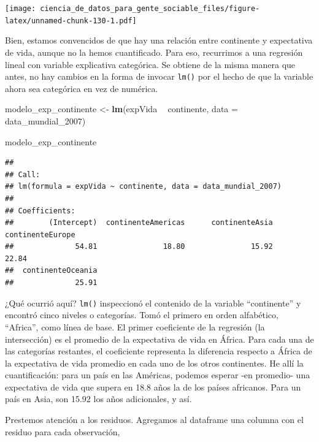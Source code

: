 \documentclass[spanish,]{book}
\newenvironment{Shaded}{\begin{snugshade}}{\end{snugshade}}
\newcommand{\DataTypeTok}[1]{\textcolor[rgb]{0.13,0.29,0.53}{#1}}
\newcommand{\DecValTok}[1]{\textcolor[rgb]{0.00,0.00,0.81}{#1}}
\newcommand{\KeywordTok}[1]{\textcolor[rgb]{0.13,0.29,0.53}{\textbf{#1}}}
\newcommand{\NormalTok}[1]{#1}
\newcommand{\OperatorTok}[1]{\textcolor[rgb]{0.81,0.36,0.00}{\textbf{#1}}}
\newcommand{\StringTok}[1]{\textcolor[rgb]{0.31,0.60,0.02}{#1}}
\begin{document}
\texttt{[image: ciencia\_de\_datos\_para\_gente\_sociable\_files/figure-latex/unnamed-chunk-130-1.pdf]}

Bien, estamos convencidos de que hay una relación entre continente y expectativa de vida, aunque no la hemos cuantificado. Para eso, recurrimos a una regresión lineal con variable explicativa categórica. Se obtiene de la misma manera que antes, no hay cambios en la forma de invocar \texttt{lm()} por el hecho de que la variable ahora sea categórica en vez de numérica.

\begin{Shaded}
\begin{Highlighting}[]
\NormalTok{modelo_exp_continente <-}\StringTok{ }\KeywordTok{lm}\NormalTok{(expVida }\OperatorTok{~}\StringTok{ }\NormalTok{continente, }\DataTypeTok{data =}\NormalTok{ data_mundial_}\DecValTok{2007}\NormalTok{)}


\NormalTok{modelo_exp_continente}
\end{Highlighting}
\end{Shaded}

\begin{verbatim}
## 
## Call:
## lm(formula = expVida ~ continente, data = data_mundial_2007)
## 
## Coefficients:
##        (Intercept)  continenteAmericas      continenteAsia    continenteEurope  
##              54.81               18.80               15.92               22.84  
##  continenteOceania  
##              25.91
\end{verbatim}

¿Qué ocurrió aquí? \texttt{lm()} inspeccionó el contenido de la variable ``continente'' y encontró cinco niveles o categorías. Tomó el primero en orden alfabético, ``Africa'', como línea de base. El primer coeficiente de la regresión (la intersección) es el promedio de la expectativa de vida en África. Para cada una de las categorías restantes, el coeficiente representa la diferencia respecto a África de la expectativa de vida promedio en cada uno de los otros continentes. He allí la cuantificación: para un país en las Américas, podemos esperar -en promedio- una expectativa de vida que supera en 18.8 años la de los países africanos. Para un país en Asia, son 15.92 los años adicionales, y así.

Prestemos atención a los residuos. Agregamos al dataframe una columna con el residuo para cada observación,

\begin{Shaded}
\end{Shaded}
\end{document}

